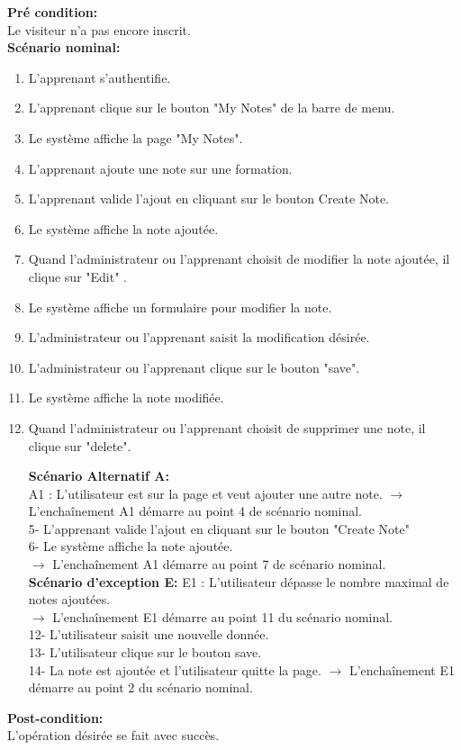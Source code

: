 \textbf{Pré condition:}\\
Le visiteur n'a pas encore inscrit.\\
\textbf{Scénario nominal:}
\begin{enumerate}
	\item L'apprenant s'authentifie.
	\item L'apprenant clique sur le bouton "My Notes" de la barre de menu. 
	\item Le système affiche la page "My Notes".
	\item L'apprenant ajoute une note sur une formation.
	\item L'apprenant valide l'ajout en cliquant sur le bouton Create Note.
	\item Le système affiche la note ajoutée.
	\item Quand l'administrateur ou l'apprenant choisit  de modifier la note ajoutée, il clique sur "Edit" .
	\item Le système affiche un formulaire pour modifier la note.
	\item L'administrateur ou l'apprenant saisit la modification désirée.
	\item L'administrateur ou l'apprenant clique sur le bouton "save".
	\item Le système affiche la note modifiée.
	\item Quand l'administrateur ou l'apprenant choisit de supprimer une note, il clique sur "delete".
 
	
	\textbf{Scénario Alternatif A:}\\
	A1 : L'utilisateur est sur la page et veut ajouter une autre note.
	$\rightarrow$ L'enchaînement A1 démarre au point 4 de scénario nominal.\\
	5- L'apprenant valide l'ajout en cliquant sur le bouton "Create Note" \\
	6- Le système affiche la note ajoutée.\\
	$\rightarrow$ L'enchaînement A1 démarre au point 7 de scénario nominal.\\
	\textbf{Scénario d'exception E:}
	E1 : L'utilisateur dépasse le nombre maximal de notes ajoutées.\\
	$\rightarrow$ L'enchaînement E1 démarre au point 11 du scénario nominal.\\ 
	12- L'utilisateur saisit une nouvelle donnée.\\ 
	13- L'utilisateur clique sur le bouton save.\\
	14- La note est ajoutée et l'utilisateur quitte la page.
	$\rightarrow$ L'enchaînement E1 démarre au point 2 du scénario nominal.\\
	
	
\end{enumerate}
\textbf{Post-condition:}\\
L'opération désirée se fait avec succès.
\newpage
